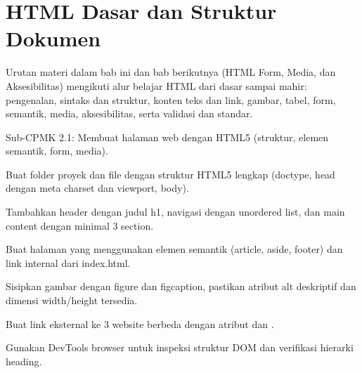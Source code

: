 \documentclass[../main.tex]{subfiles}
\begin{document}
\chapter{HTML Dasar dan Struktur Dokumen}

Urutan materi dalam bab ini dan bab berikutnya (HTML Form, Media, dan Aksesibilitas) mengikuti alur belajar HTML dari dasar sampai mahir: pengenalan, sintaks dan struktur, konten teks dan link, gambar, tabel, form, semantik, media, aksesibilitas, serta validasi dan standar.

\begin{subcpmk}
  \item Sub-CPMK 2.1: Membuat halaman web dengan HTML5 (struktur, elemen semantik, form, media).
\end{subcpmk}















\begin{aktivitas}
  \item Buat folder proyek dan file  dengan struktur HTML5 lengkap (doctype, head dengan meta charset dan viewport, body).
  \item Tambahkan header dengan judul h1, navigasi dengan unordered list, dan main content dengan minimal 3 section.
  \item Buat halaman  yang menggunakan elemen semantik (article, aside, footer) dan link internal dari index.html.
  \item Sisipkan gambar dengan figure dan figcaption, pastikan atribut alt deskriptif dan dimensi width/height tersedia.
  \item Buat link eksternal ke 3 website berbeda dengan atribut  dan .
  \item Gunakan DevTools browser untuk inspeksi struktur DOM dan verifikasi hierarki heading.
\end{aktivitas}
\end{document}

